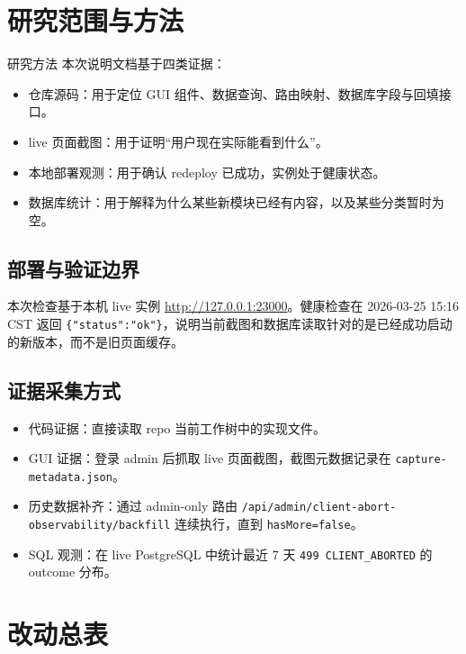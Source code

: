 \documentclass[a4paper]{article}
\newcommand{\filepath}[1]{\nolinkurl{#1}}
\begin{document}
\section{研究范围与方法}

\begin{methodbox}{研究方法}
本次说明文档基于四类证据：
\begin{itemize}
\item 仓库源码：用于定位 GUI 组件、数据查询、路由映射、数据库字段与回填接口。
\item live 页面截图：用于证明“用户现在实际能看到什么”。
\item 本地部署观测：用于确认 redeploy 已成功，实例处于健康状态。
\item 数据库统计：用于解释为什么某些新模块已经有内容，以及某些分类暂时为空。
\end{itemize}
\end{methodbox}

\subsection{部署与验证边界}

本次检查基于本机 live 实例 \url{http://127.0.0.1:23000}。健康检查在 2026-03-25 15:16 CST 返回 \texttt{\{"status":"ok"\}}，说明当前截图和数据库读取针对的是已经成功启动的新版本，而不是旧页面缓存。

\subsection{证据采集方式}

\begin{itemize}
\item 代码证据：直接读取 repo 当前工作树中的实现文件。
\item GUI 证据：登录 admin 后抓取 live 页面截图，截图元数据记录在 \filepath{capture-metadata.json}。
\item 历史数据补齐：通过 admin-only 路由 \filepath{/api/admin/client-abort-observability/backfill} 连续执行，直到 \texttt{hasMore=false}。
\item SQL 观测：在 live PostgreSQL 中统计最近 7 天 \texttt{499 CLIENT\_ABORTED} 的 outcome 分布。
\end{itemize}

\section{改动总表}
\end{document}
